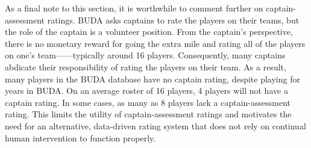 As a final note to this section, it is worthwhile to comment further on captain-assessment ratings. BUDA asks captains to rate the players on their teams, but the role of the captain is a volunteer position. From the captain's perspective, there is no monetary reward for going the extra mile and rating all of the players on one's team——typically around 16 players. Consequently, many captains abdicate their responsibility of rating the players on their team. As a result, many players in the BUDA database have no captain rating, despite playing for years in BUDA. On an average roster of 16 players, 4 players will not have a captain rating. In some cases, as many as 8 players lack a captain-assessment rating. This limits the utility of captain-assessment ratings and motivates the need for an alternative, data-driven rating system that does not rely on continual human intervention to function properly.
